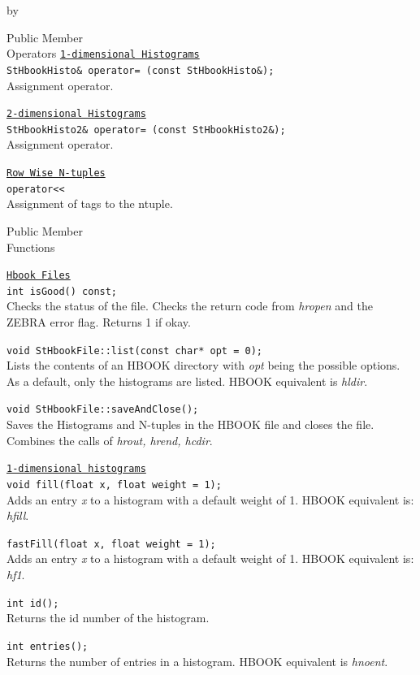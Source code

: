 \documentclass[twoside]{article}
\newcommand{\comp}[1]{\texttt{#1}}%
\newcommand{\entrylabel}[1]{\mbox{\textbf{{#1}}}\hfil}%
\newenvironment{entry}
{\begin{list}{}%
    {\renewcommand{\makelabel}{\entrylabel}%
     \setlength{\labelwidth}{90pt}%
     \setlength{\leftmargin}{\labelwidth}
     \advance\leftmargin by \labelsep%
      }%
    }%
  {\end{list}}
\newcommand{\Entrylabel}[1]%
{\raisebox{0pt}[1ex][0pt]{\makebox[\labelwidth][l]%
    {\parbox[t]{\labelwidth}{\hspace{0pt}\textbf{{#1}}}}}}
\newenvironment{Entry}%
{\renewcommand{\entrylabel}{\Entrylabel}\begin{entry}}%
  {\end{entry}}
\begin{document}
\begin{description}
\begin{Entry}
\item[Public Member\\ Operators]
  \comp{\underline{1-dimensional Histograms}} \\
  \verb+StHbookHisto& operator= (const StHbookHisto&);+\\
  Assignment operator.

  \comp{\underline{2-dimensional Histograms}} \\
  \verb+StHbookHisto2& operator= (const StHbookHisto2&);+\\
  Assignment operator.

  \comp{\underline{Row Wise N-tuples}} \\
  \verb+operator<<+\\
  Assignment of tags to the ntuple.
  
\item[Public Member\\ Functions]

  \comp{\underline{Hbook Files}} \\
  \verb+int isGood() const;+\\
  Checks the status of the file.  Checks the return
  code from {\em hropen} and the ZEBRA error flag.
  Returns 1 if okay.
  
  \verb+void StHbookFile::list(const char* opt = 0);+\\
  Lists the contents of an HBOOK directory with {\em opt}
  being the possible options.  As a default, only the histograms
  are listed.  HBOOK equivalent is {\em hldir}.
  
  \verb+void StHbookFile::saveAndClose();+\\
  Saves the Histograms and N-tuples in the HBOOK file
  and closes the file.  Combines the calls of
  {\em hrout,   hrend,  hcdir}.
  
  \comp{\underline{1-dimensional histograms}}\\
  \verb+void fill(float x, float weight = 1);+\\
  Adds an entry {\em x} to a histogram with a default weight of 1.
  HBOOK equivalent is: {\em hfill}.
  
  \verb+fastFill(float x, float weight = 1);+\\
  Adds an entry {\em x} to a histogram with a default weight of 1.
  HBOOK equivalent is: {\em hf1}.

  \verb+int id();+\\
  Returns the id number of the histogram. 

  \verb+int entries();+\\
  Returns the number of entries in a histogram.  HBOOK equivalent
  is {\em  hnoent}.
  

\end{Entry}
\end{description}
\end{document}
